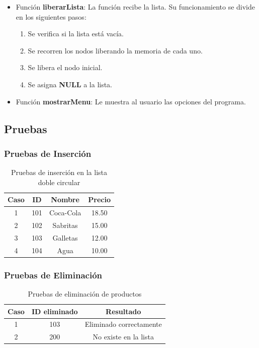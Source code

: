 \documentclass[letterpaper,12pt,oneside]{article}
\begin{document}
\begin{itemize}
\item Función \textbf{liberarLista}: La función recibe la lista. Su funcionamiento se divide en los siguientes pasos:
\begin{enumerate}
    \item Se verifica si la lista está vacía.
    \item Se recorren los nodos liberando la memoria de cada uno.
    \item Se libera el nodo inicial.
    \item Se asigna \textbf{NULL} a la lista.
\end{enumerate}

\item Función \textbf{mostrarMenu}: Le muestra al usuario las opciones del programa.

\end{itemize}
\subsection{Pruebas}
\subsubsection{Pruebas de Inserción}

\begin{table}[H]
\centering
\begin{tabular}{|c|c|c|c|}
\hline
\textbf{Caso} & \textbf{ID} & \textbf{Nombre} & \textbf{Precio} \\
\hline
1 & 101 & Coca-Cola & 18.50 \\
2 & 102 & Sabritas & 15.00 \\
3 & 103 & Galletas & 12.00 \\
4 & 104 & Agua & 10.00 \\
\hline
\end{tabular}
\caption{Pruebas de inserción en la lista doble circular}
\end{table}

\subsubsection{Pruebas de Eliminación}

\begin{table}[H]
\centering
\begin{tabular}{|c|c|c|}
\hline
\textbf{Caso} & \textbf{ID eliminado} & \textbf{Resultado} \\
\hline
1 & 103 & Eliminado correctamente \\
2 & 200 & No existe en la lista \\
\hline
\end{tabular}
\caption{Pruebas de eliminación de productos}
\end{table}
\end{document}

